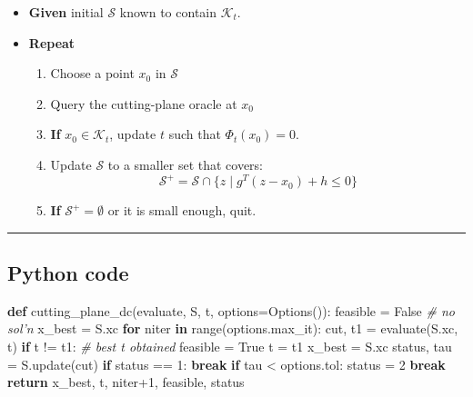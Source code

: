 \documentclass[]{article}
\newenvironment{Shaded}{}{}
\newcommand{\BuiltInTok}[1]{#1}
\newcommand{\CommentTok}[1]{\textcolor[rgb]{0.38,0.63,0.69}{\textit{#1}}}
\newcommand{\ControlFlowTok}[1]{\textcolor[rgb]{0.00,0.44,0.13}{\textbf{#1}}}
\newcommand{\DecValTok}[1]{\textcolor[rgb]{0.25,0.63,0.44}{#1}}
\newcommand{\KeywordTok}[1]{\textcolor[rgb]{0.00,0.44,0.13}{\textbf{#1}}}
\newcommand{\NormalTok}[1]{#1}
\newcommand{\OperatorTok}[1]{\textcolor[rgb]{0.40,0.40,0.40}{#1}}
\newcommand{\VariableTok}[1]{\textcolor[rgb]{0.10,0.09,0.49}{#1}}
\providecommand{\tightlist}{%
  \setlength{\itemsep}{0pt}\setlength{\parskip}{0pt}}
\begin{document}
\begin{itemize}
\tightlist
\item
  \textbf{Given} initial \(\mathcal{S}\) known to contain
  \(\mathcal{K}_t\).
\item
  \textbf{Repeat}

  \begin{enumerate}
  \def\labelenumi{\arabic{enumi}.}
  \tightlist
  \item
    Choose a point \(x_0\) in \(\mathcal{S}\)
  \item
    Query the cutting-plane oracle at \(x_0\)
  \item
    \textbf{If} \(x_0 \in \mathcal{K}_t\), update \(t\) such that
    \(\Phi_t(x_0) = 0\).
  \item
    Update \(\mathcal{S}\) to a smaller set that covers:
    \[\mathcal{S}^+ = \mathcal{S} \cap \{z \mid g^T (z - x_0) + h \leq 0\} \]
  \item
    \textbf{If} \(\mathcal{S}^+ = \emptyset\) or it is small enough,
    quit.
  \end{enumerate}
\end{itemize}

\begin{center}\rule{0.5\linewidth}{\linethickness}\end{center}

\hypertarget{python-code-2}{%
\subsection{Python code}\label{python-code-2}}

\begin{Shaded}
\begin{Highlighting}[]
\KeywordTok{def}\NormalTok{ cutting_plane_dc(evaluate, S, t, options}\OperatorTok{=}\NormalTok{Options()):}
\NormalTok{    feasible }\OperatorTok{=} \VariableTok{False}  \CommentTok{# no sol'n}
\NormalTok{    x_best }\OperatorTok{=}\NormalTok{ S.xc}
    \ControlFlowTok{for}\NormalTok{ niter }\KeywordTok{in} \BuiltInTok{range}\NormalTok{(options.max_it):}
\NormalTok{        cut, t1 }\OperatorTok{=}\NormalTok{ evaluate(S.xc, t)}
        \ControlFlowTok{if}\NormalTok{ t }\OperatorTok{!=}\NormalTok{ t1:  }\CommentTok{# best t obtained}
\NormalTok{            feasible }\OperatorTok{=} \VariableTok{True}
\NormalTok{            t }\OperatorTok{=}\NormalTok{ t1}
\NormalTok{            x_best }\OperatorTok{=}\NormalTok{ S.xc}
\NormalTok{        status, tau }\OperatorTok{=}\NormalTok{ S.update(cut)}
        \ControlFlowTok{if}\NormalTok{ status }\OperatorTok{==} \DecValTok{1}\NormalTok{:}
            \ControlFlowTok{break}
        \ControlFlowTok{if}\NormalTok{ tau }\OperatorTok{<}\NormalTok{ options.tol:}
\NormalTok{            status }\OperatorTok{=} \DecValTok{2}
            \ControlFlowTok{break}
    \ControlFlowTok{return}\NormalTok{ x_best, t, niter}\OperatorTok{+}\DecValTok{1}\NormalTok{, feasible, status}
\end{Highlighting}
\end{Shaded}
\end{document}
